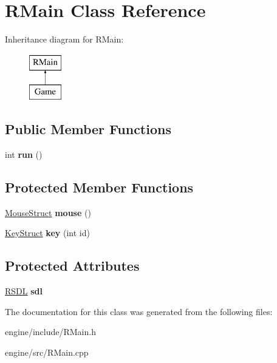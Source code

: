 \hypertarget{classRMain}{
\section{RMain Class Reference}
\label{classRMain}
}
Inheritance diagram for RMain:\begin{figure}[H]
\begin{center}
\leavevmode
\includegraphics[height=2.000000cm]{classRMain}
\end{center}
\end{figure}
\subsection*{Public Member Functions}
\begin{DoxyCompactItemize}
\item 
\hypertarget{classRMain_a13a0972379c50832f3fde750043774c0}{
int {\bfseries run} ()}
\label{classRMain_a13a0972379c50832f3fde750043774c0}

\end{DoxyCompactItemize}
\subsection*{Protected Member Functions}
\begin{DoxyCompactItemize}
\item 
\hypertarget{classRMain_a3152809f7275f2f22901f0ce324ca8a8}{
\hyperlink{structMouseStruct}{MouseStruct} {\bfseries mouse} ()}
\label{classRMain_a3152809f7275f2f22901f0ce324ca8a8}

\item 
\hypertarget{classRMain_af59e77996c7aab57266de8caf93d2507}{
\hyperlink{structKeyStruct}{KeyStruct} {\bfseries key} (int id)}
\label{classRMain_af59e77996c7aab57266de8caf93d2507}

\end{DoxyCompactItemize}
\subsection*{Protected Attributes}
\begin{DoxyCompactItemize}
\item 
\hypertarget{classRMain_a029221b02c334c092cf86983e44b8231}{
\hyperlink{classRSDL}{RSDL} {\bfseries sdl}}
\label{classRMain_a029221b02c334c092cf86983e44b8231}

\end{DoxyCompactItemize}


The documentation for this class was generated from the following files:\begin{DoxyCompactItemize}
\item 
engine/include/RMain.h\item 
engine/src/RMain.cpp\end{DoxyCompactItemize}
